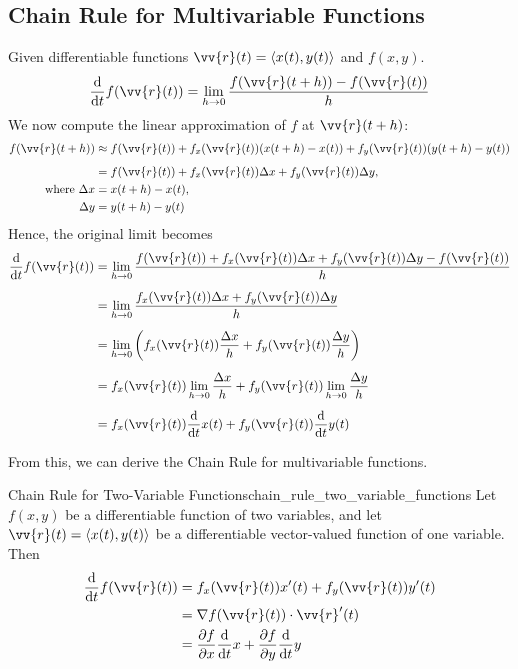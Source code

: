 \subsection{Chain Rule for Multivariable Functions}
\begin{example}
Given differentiable functions $\vv{r}(t) = \ang{x(t), y(t)}$ and $f(x, y)$.
\[
    \ddt f(\vv{r}(t)) = \lim_{h \to 0} \frac{f(\vv{r}(t+h)) - f(\vv{r}(t))}{h}
\]
We now compute the linear approximation of $f$ at $\vv{r}(t+h)$:
\begin{align*}
    f(\vv{r}(t+h)) &\approx f(\vv{r}(t)) + f_x(\vv{r}(t))(x(t+h) - x(t)) + f_y(\vv{r}(t))(y(t+h) - y(t)) \\[0.5em]
    &= f(\vv{r}(t)) + f_x(\vv{r}(t))\Delta x + f_y(\vv{r}(t))\Delta y, \\
    \text{where } \Delta x &= x(t+h) - x(t), \\
    \Delta y &= y(t+h) - y(t)
\end{align*}
Hence, the original limit becomes
\begin{align*}
    \ddt f(\vv{r}(t)) &= \lim_{h \to 0} \frac{f(\vv{r}(t)) + f_x(\vv{r}(t))\Delta x + f_y(\vv{r}(t))\Delta y - f(\vv{r}(t))}{h} \\[0.5em]
    &= \lim_{h \to 0} \frac{f_x(\vv{r}(t))\Delta x + f_y(\vv{r}(t))\Delta y}{h} \\[0.5em]
    &= \lim_{h \to 0} \left( f_x(\vv{r}(t))\frac{\Delta x}{h} + f_y(\vv{r}(t))\frac{\Delta y}{h} \right) \\[0.5em]
    &= f_x(\vv{r}(t))\lim_{h \to 0} \frac{\Delta x}{h} + f_y(\vv{r}(t))\lim_{h \to 0} \frac{\Delta y}{h} \\[0.5em]
    &= f_x(\vv{r}(t))\ddt x(t) + f_y(\vv{r}(t))\ddt y(t)
\end{align*}
\end{example}

From this, we can derive the Chain Rule for multivariable functions.

\begin{theorem}{Chain Rule for Two-Variable Functions}{chain_rule_two_variable_functions}
Let $f(x, y)$ be a differentiable function of two variables, and let $\vv{r}(t) = \ang{x(t), y(t)}$ be a differentiable vector-valued function of one variable. Then
\begin{align*}
    \ddt f(\vv{r}(t)) &= f_x(\vv{r}(t))x'(t) + f_y(\vv{r}(t))y'(t) \\
                      &= \nabla f(\vv{r}(t)) \cdot \vv{r}'(t) \\
                      &= \pdv{f}{x} \ddt{x} + \pdv{f}{y} \ddt{y}
\end{align*}
\end{theorem}


